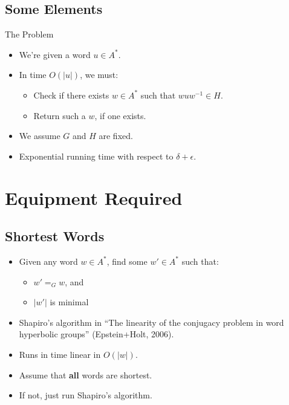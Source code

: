 \documentclass{article}
\begin{document}
\subsection{Some Elements}

\begin{frame}{The Problem}
  \begin{itemize}
    \item We're given a word $u \in A^*$.
	\item In time $O(|u|)$, we must:
	\pause
	\begin{itemize}
	  \item Check if there exists $w \in A^*$ such that $wuw^{-1} \in H$.
	  \pause
	  \item Return such a $w$, if one exists.
	\end{itemize}
	\pause
	\item We assume $G$ and $H$ are fixed.
	\item Exponential running time with respect to $\delta + \epsilon$.
  \end{itemize}
\end{frame}

\section{Equipment Required}

\subsection{Shortest Words}

\begin{frame}
  \begin{itemize}
    \item Given any word $w \in A^*$, find some $w' \in A^*$ such that:
	\begin{itemize}
	  \item $w' =_G w$, and
	  \item $|w'|$ is minimal
	\end{itemize}
	\pause
	\item Shapiro's algorithm in ``The linearity of the conjugacy problem in word hyperbolic groups'' (Epstein+Holt, 2006).
	\item Runs in time linear in $O(|w|)$.
	\pause
	\item Assume that \textbf{all} words are shortest.
	\item If not, just run Shapiro's algorithm.
  \end{itemize}
\end{frame}
\end{document}
